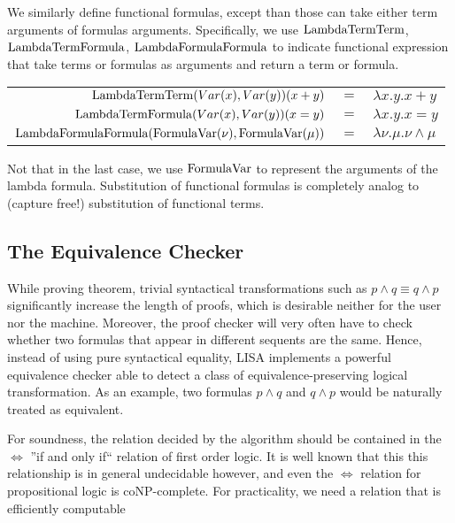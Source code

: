 We similarly define functional formulas, except than those can take either term arguments of formulas arguments. Specifically, we use $\operatorname{LambdaTermTerm}$, $\operatorname{LambdaTermFormula}$, $\operatorname{LambdaFormulaFormula}$ to indicate functional expression that take terms or formulas as arguments and return a term or formula.

\begin{ex}
\begin{center}
\begin{tabular}{|r c l|}
\hline
$\operatorname{LambdaTermTerm}(Var(x), Var(y))(x+y)$ & $=$ & $\lambda x.y. x+y$ \\
$\operatorname{LambdaTermFormula}(Var(x), Var(y))(x=y)$ & $=$ & $\lambda x.y. x=y$ \\
$\operatorname{LambdaFormulaFormula}(\operatorname{FormulaVar}(\nu), \operatorname{FormulaVar}(\mu))$ & $=$ & $\lambda \nu.\mu. \nu \land \mu$ \\
\hline
\end{tabular}
\end{center}

\end{ex}
Not that in the last case, we use $\operatorname{FormulaVar}$ to represent the arguments of the lambda formula. Substitution of functional formulas is completely analog to (capture free!) substitution of functional terms.



\subsection{The Equivalence Checker}
\label{subs:equivalencechecker}
While proving theorem, trivial syntactical transformations such as $p\land q \equiv q\land p$ significantly increase the length of proofs, which is desirable neither for the user nor the machine. Moreover, the proof checker will very often have to check whether two formulas that appear in different sequents are the same. Hence, instead of using pure syntactical equality, LISA implements a powerful equivalence checker able to detect a class of equivalence-preserving logical transformation. As an example, two formulas $p\land q$ and $q\land p$ would be naturally treated as equivalent.

For soundness, the relation decided by the algorithm should be contained in the $\Longleftrightarrow$ ''if and only if`` relation of first order logic. It is well known that this this relationship is in general undecidable however, and even the $\Longleftrightarrow$ relation for propositional logic is coNP-complete. For practicality, we need a relation that is efficiently computable

